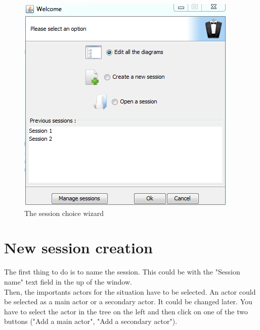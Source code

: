 \begin{figure}[h!]
\centering
\includegraphics[scale=0.55]{images/ouverture_session.png}

\caption{The session choice wizard}
\end{figure}

\section{New session creation}
The first thing to do is to name the session. This could be with the "Session name" text field in the up of the window.\\

Then, the importants actors for the situation have to be selected. An actor could be selected as a main actor or a secondary actor. It could be changed later. You have to select the actor in the tree on the left and then click on one of the two buttons ("Add a main actor", "Add a secondary actor").\\

